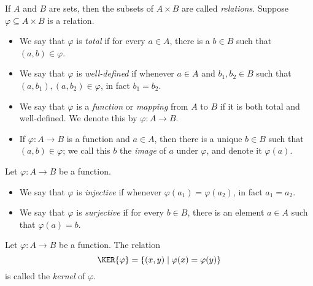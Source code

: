 \documentclass{article}
\begin{document}

\begin{dfn}[Function]
If $A$ and $B$ are sets, then the subsets of $A \times B$ are called \emph{relations}. Suppose $\varphi \subseteq A \times B$ is a relation.
\begin{itemize}
\item We say that $\varphi$ is \emph{total} if for every $a \in A$, there is a $b \in B$ such that $(a,b) \in \varphi$.
\item We say that $\varphi$ is \emph{well-defined} if whenever $a \in A$ and $b_1,b_2 \in B$ such that $(a,b_1), (a,b_2) \in \varphi$, in fact $b_1 = b_2$.
\item We say that $\varphi$ is a \emph{function} or \emph{mapping} from $A$ to $B$ if it is both total and well-defined. We denote this by $\varphi : A \rightarrow B$.
\item If $\varphi : A \rightarrow B$ is a function and $a \in A$, then there is a unique $b \in B$ such that $(a,b) \in \varphi$; we call this $b$ the \emph{image} of $a$ under $\varphi$, and denote it $\varphi(a)$.
\end{itemize}
\end{dfn}

\begin{dfn}
Let $\varphi : A \rightarrow B$ be a function.
\begin{itemize}
\item We say that $\varphi$ is \emph{injective} if whenever $\varphi(a_1) = \varphi(a_2)$, in fact $a_1 = a_2$.
\item We say that $\varphi$ is \emph{surjective} if for every $b \in B$, there is an element $a \in A$ such that $\varphi(a) = b$.
\end{itemize}
\end{dfn}

\begin{dfn}[Kernel]
Let $\varphi : A \rightarrow B$ be a function. The relation \[ \KER{\varphi} = \{ (x,y) \mid \varphi(x) = \varphi(y) \} \] is called the \emph{kernel} of $\varphi$.
\end{dfn}
\end{document}

